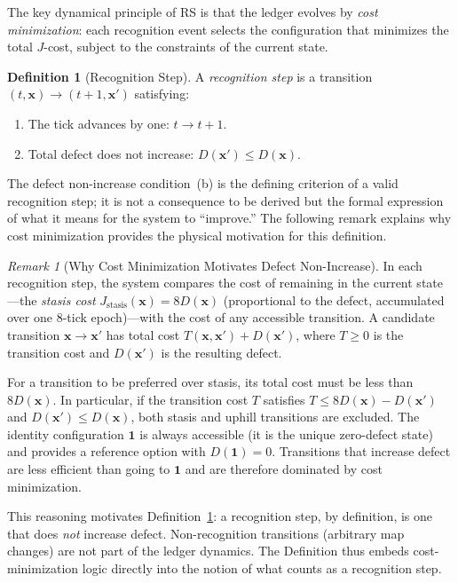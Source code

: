\documentclass[12pt,a4paper]{article}
\theoremstyle{definition}
\newtheorem{definition}[theorem]{Definition}
\theoremstyle{remark}
\newtheorem{remark}[theorem]{Remark}
\begin{document}
The key dynamical principle of RS is that the ledger evolves by
\emph{cost minimization}: each recognition event selects the
configuration that minimizes the total $J$-cost, subject to the
constraints of the current state.

\begin{definition}[Recognition Step]
\label{def:recog-step}
A \emph{recognition step} is a transition
$(t, \mathbf{x}) \to (t{+}1, \mathbf{x}')$ satisfying:
\begin{enumerate}[label=(\alph*),nosep]
  \item The tick advances by one: $t \to t{+}1$.
  \item Total defect does not increase: $D(\mathbf{x}') \leq D(\mathbf{x})$.
\end{enumerate}
\end{definition}

The defect non-increase condition~(b) is the defining criterion of a
valid recognition step; it is not a consequence to be derived but the
formal expression of what it means for the system to ``improve.''
The following remark explains why cost minimization provides the
physical motivation for this definition.

\begin{remark}[Why Cost Minimization Motivates Defect Non-Increase]
\label{rem:cost-min}
In each recognition step, the system compares the cost of remaining in
the current state---the \emph{stasis cost}
$J_{\mathrm{stasis}}(\mathbf{x}) = 8 D(\mathbf{x})$ (proportional to
the defect, accumulated over one 8-tick epoch)---with the cost of any
accessible transition.  A candidate transition
$\mathbf{x} \to \mathbf{x}'$ has total cost
$T(\mathbf{x},\mathbf{x}') + D(\mathbf{x}')$, where $T \geq 0$ is
the transition cost and $D(\mathbf{x}')$ is the resulting defect.

For a transition to be preferred over stasis, its total cost must be
less than $8D(\mathbf{x})$.  In particular, if the transition cost $T$
satisfies $T \leq 8D(\mathbf{x}) - D(\mathbf{x}')$ and $D(\mathbf{x}') \leq
D(\mathbf{x})$, both stasis and uphill transitions are excluded.
The identity configuration $\mathbf{1}$ is always accessible (it is
the unique zero-defect state) and provides a reference option with
$D(\mathbf{1}) = 0$.  Transitions that increase defect are less
efficient than going to $\mathbf{1}$ and are therefore dominated by
cost minimization.

This reasoning motivates Definition~\ref{def:recog-step}: a recognition
step, by definition, is one that does \emph{not} increase defect.
Non-recognition transitions (arbitrary map changes) are not part of the
ledger dynamics.  The Definition thus embeds cost-minimization logic
directly into the notion of what counts as a recognition step.
\end{remark}
\end{document}
